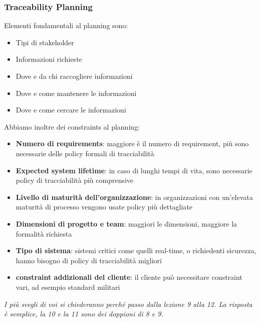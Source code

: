 \documentclass[11pt]{article}
\begin{document}
\subsubsection{Traceability Planning}
Elementi fondamentali al planning sono:
\begin{itemize}
    \item Tipi di stakeholder
    \item Informazioni richieste
    \item Dove e da chi raccogliere informazioni
    \item Dove e come mantenere le informazioni 
    \item Dove e come cercare le informazioni
\end{itemize}
Abbiamo inoltre dei \glspl{constraint} al planning: 
\begin{itemize}
    \item \textbf{Numero di requirements}: maggiore è il numero di requirement, più sono necessarie delle policy formali di tracciabilità
    \item \textbf{Expected system lifetime}: in caso di lunghi tempi di vita, sono necessarie policy di tracciabilità più comprensive
    \item \textbf{Livello di maturità dell'organizzazione}: in organizzazioni con un'elevata maturità di processo vengono usate policy più dettagliate
    \item \textbf{Dimensioni di progetto e team}: maggiori le dimensioni, maggiore la formalità richiesta
    \item \textbf{Tipo di sistema}: sistemi critici come quelli real-time, o richiedenti sicurezza, hanno bisogno di policy di tracciabilità migliori
    \item \textbf{\Gls{constraint} addizionali del cliente}: il cliente può necessitare \gls{constraint} vari, ad esempio standard militari
\end{itemize}
\textit{I più svegli di voi si chiederanno perché passo dalla lezione 9 alla 12. La risposta è semplice, la 10 e la 11 sono dei doppioni di 8 e 9.}
\setcounter{section}{11}
\end{document}
